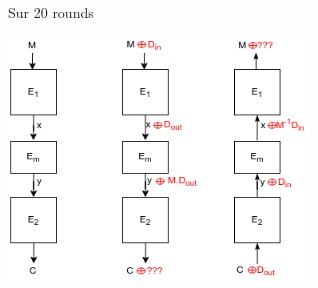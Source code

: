 \begin{frame}{Sur 20 rounds}
        \begin{center}                  
            \includegraphics[width=0.6\textwidth]{img/crypto/jafar/auto/first-try.png}
        \end{center}
\end{frame}

